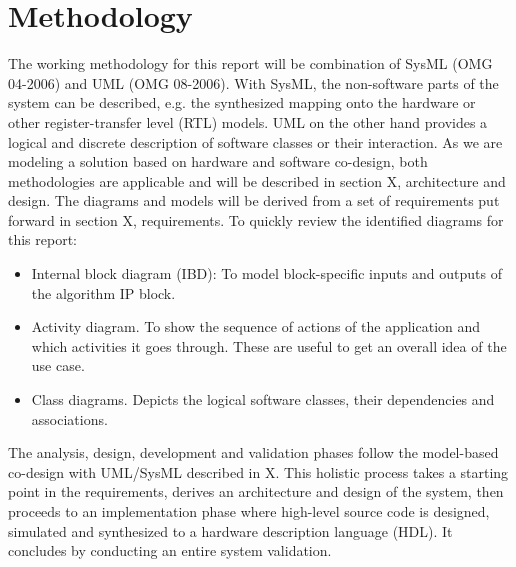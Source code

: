 \section{Methodology}

The working methodology for this report will be combination of SysML (OMG 04-2006) and UML (OMG 08-2006). With SysML, the non-software parts of the system can be described, e.g. the synthesized mapping onto the hardware or other register-transfer level (RTL) models. UML on the other hand provides a logical and discrete description of software classes or their interaction. As we are modeling a solution based on hardware and software co-design, both methodologies are applicable and will be described in section X, architecture and design. The diagrams and models will be derived from a set of requirements put forward in section X, requirements. To quickly review the identified diagrams for this report:

\begin{itemize}
	\item Internal block diagram (IBD): To model block-specific inputs and outputs of the algorithm IP block.
	\item Activity diagram. To show the sequence of actions of the application and which activities it goes through. These are useful to get an overall idea of the use case.
	\item Class diagrams. Depicts the logical software classes, their dependencies and associations.
\end{itemize}

The analysis, design, development and validation phases follow the model-based co-design with UML/SysML described in X. This holistic process takes a starting point in the requirements, derives an architecture and design of the system, then proceeds to an implementation phase where high-level source code is designed, simulated and synthesized to a hardware description language (HDL). It concludes by conducting an entire system validation.
